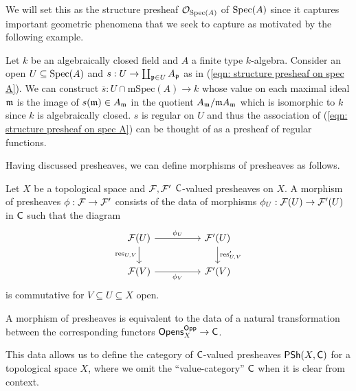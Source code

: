 We will set this as the structure presheaf $\mathcal{O}_{\operatorname{Spec}(A)}$ of  $\operatorname{Spec}(A)$ since it captures important geometric phenomena that we seek to capture as motivated by the following example. 
\begin{example}\label{ex: regular functions on affine scheme}
    Let $k$ be an algebraically closed field and $A$ a finite type $k$-algebra. Consider an open $U\subseteq\operatorname{Spec}(A)$ and $s:U\to\coprod_{\mathfrak{p}\in U}A_{\mathfrak{p}}$ as in (\ref{eqn: structure presheaf on spec A}). We can construct $\overline{s}:U\cap\mathrm{mSpec}(A)\to k$ whose value on each maximal ideal $\mathfrak{m}$ is the image of $s(\mathfrak{m})\in A_{\mathfrak{m}}$ in the quotient $A_{\mathfrak{m}}/\mathfrak{m} A_{\mathfrak{m}}$ which is isomorphic to $k$ since $k$ is algebraically closed. $s$ is regular on $U$ and thus the association of (\ref{eqn: structure presheaf on spec A}) can be thought of as a presheaf of regular functions. 
\end{example}
Having discussed presheaves, we can define morphisms of presheaves as follows. 
\begin{definition}\label{def: morphism of presheaves}
    Let $X$ be a topological space and $\mathcal{F},\mathcal{F}'$ $\mathsf{C}$-valued presheaves on $X$. A morphism of presheaves $\phi:\mathcal{F}\to\mathcal{F}'$ consists of the data of morphisms $\phi_{U}:\mathcal{F}(U)\to\mathcal{F}'(U)$ in $\mathsf{C}$ such that the diagram 
    $$%
    \begin{tikzcd}
        {\Fcal(U)} && {\Fcal'(U)} \\
        {\Fcal(V)} && {\Fcal'(V)}
        \arrow["{\phi_{U}}", from=1-1, to=1-3]
        \arrow["{\res_{U,V}}"', from=1-1, to=2-1]
        \arrow["{\res_{U,V}'}", from=1-3, to=2-3]
        \arrow["{\phi_{V}}"', from=2-1, to=2-3]
    \end{tikzcd}$$
    is commutative for $V\subseteq U\subseteq X$ open.
\end{definition}
\begin{remark}\label{rmk: morphism of presheaves is a natural transformation}
    A morphism of presheaves is equivalent to the data of a natural transformation between the corresponding functors $\mathsf{Opens}_{X}^{\mathsf{Opp}}\to\mathsf{C}$. 
\end{remark}
This data allows us to define the category of $\mathsf{C}$-valued presheaves $\mathsf{PSh}(X,\mathsf{C})$ for a topological space $X$, where we omit the ``value-category'' $\mathsf{C}$ when it is clear from context. 

